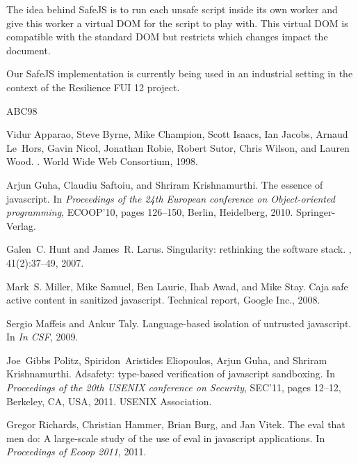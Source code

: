 \documentclass{article}
\newcommand{\safejs}{SafeJS\xspace}
\newcommand{\dom}{DOM\xspace}
\begin{document}
The idea behind \safejs is to run each unsafe script inside its own
worker and give this worker a virtual \dom for the script to play
with. This virtual \dom is compatible with the standard \dom but
restricts which changes impact the document.

Our \safejs implementation is currently being used in an industrial
setting in the context of the Resilience FUI 12 project.



\newcommand{\etalchar}[1]{}
\begin{thebibliography}{ABC{\etalchar{+}}98}

\bibitem[ABC{\etalchar{+}}98]{DOM98}
Vidur Apparao, Steve Byrne, Mike Champion, Scott Isaacs, Ian Jacobs, Arnaud
  Le~Hors, Gavin Nicol, Jonathan Robie, Robert Sutor, Chris Wilson, and Lauren
  Wood.
.
\newblock World Wide Web Consortium, 1998.

Arjun Guha, Claudiu Saftoiu, and Shriram Krishnamurthi.
\newblock The essence of javascript.
\newblock In {\em Proceedings of the 24th European conference on
  Object-oriented programming}, ECOOP'10, pages 126--150, Berlin, Heidelberg,
  2010. Springer-Verlag.

Galen~C. Hunt and James~R. Larus.
\newblock Singularity: rethinking the software stack.
, 41(2):37--49, 2007.

\bibitem[MSL{\etalchar{+}}08]{Mill08a}
Mark~S. Miller, Mike Samuel, Ben Laurie, Ihab Awad, and Mike Stay.
\newblock Caja safe active content in sanitized javascript.
\newblock Technical report, Google Inc., 2008.

Sergio Maffeis and Ankur Taly.
\newblock Language-based isolation of untrusted javascript.
\newblock In {\em In CSF}, 2009.

Joe~Gibbs Politz, Spiridon~Aristides Eliopoulos, Arjun Guha, and Shriram
  Krishnamurthi.
\newblock Adsafety: type-based verification of javascript sandboxing.
\newblock In {\em Proceedings of the 20th USENIX conference on Security},
  SEC'11, pages 12--12, Berkeley, CA, USA, 2011. USENIX Association.

Gregor Richards, Christian Hammer, Brian Burg, and Jan Vitek.
\newblock The eval that men do: A large-scale study of the use of eval in
  javascript applications.
\newblock In {\em Proceedings of Ecoop 2011}, 2011.

\end{thebibliography}
\end{document}

